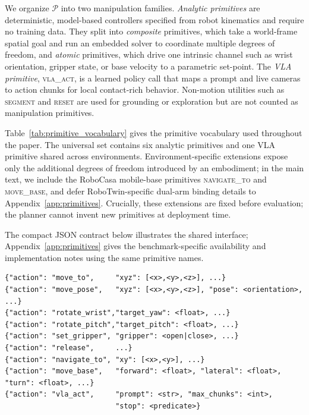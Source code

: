 \documentclass{article}
\begin{document}
We organize $\mathcal{P}$ into two manipulation families. \emph{Analytic primitives} are deterministic, model-based controllers specified from robot kinematics and require no training data. They split into \emph{composite} primitives, which take a world-frame spatial goal and run an embedded solver to coordinate multiple degrees of freedom, and \emph{atomic} primitives, which drive one intrinsic channel such as wrist orientation, gripper state, or base velocity to a parametric set-point. The \emph{VLA primitive}, \textsc{vla\_act}, is a learned policy call that maps a prompt and live cameras to action chunks for local contact-rich behavior. Non-motion utilities such as \textsc{segment} and \textsc{reset} are used for grounding or exploration but are not counted as manipulation primitives.

Table~\ref{tab:primitive_vocabulary} gives the primitive vocabulary used throughout the paper. The universal set contains six analytic primitives and one VLA primitive shared across environments. Environment-specific extensions expose only the additional degrees of freedom introduced by an embodiment; in the main text, we include the RoboCasa mobile-base primitives \textsc{navigate\_to} and \textsc{move\_base}, and defer RoboTwin-specific dual-arm binding details to Appendix~\ref{app:primitives}. Crucially, these extensions are fixed before evaluation; the planner cannot invent new primitives at deployment time.



The compact JSON contract below illustrates the shared interface; Appendix~\ref{app:primitives} gives the benchmark-specific availability and implementation notes using the same primitive names.

\begin{lstlisting}[frame=single,framerule=0.5pt]
{"action": "move_to",     "xyz": [<x>,<y>,<z>], ...}
{"action": "move_pose",   "xyz": [<x>,<y>,<z>], "pose": <orientation>, ...}
{"action": "rotate_wrist","target_yaw": <float>, ...}
{"action": "rotate_pitch","target_pitch": <float>, ...}
{"action": "set_gripper", "gripper": <open|close>, ...}
{"action": "release",     ...}
{"action": "navigate_to", "xy": [<x>,<y>], ...}
{"action": "move_base",   "forward": <float>, "lateral": <float>, "turn": <float>, ...}
{"action": "vla_act",     "prompt": <str>, "max_chunks": <int>,
                          "stop": <predicate>}
\end{lstlisting}
\end{document}
